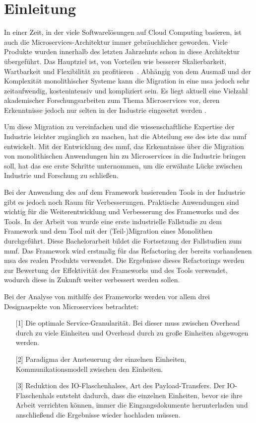 \chapter{Einleitung}
\label{chap:einleitung}

In einer Zeit, in der viele Softwarelösungen auf Cloud Computing basieren, ist auch die Mi\-cro\-services-Architektur immer gebräuchlicher geworden.
Viele Produkte wurden innerhalb des letzten Jahrzehnts schon in diese Architektur übergeführt.
Das Hauptziel ist, von Vorteilen wie besserer Skalierbarkeit, Wartbarkeit und Flexibilität zu profitieren~\cite{Fritzsch_2019,taibi2017processmotivations}.
Abhängig von dem Ausmaß und der Komplexität monolithischer Systeme kann die Migration in eine \gls{msa} jedoch sehr zeitaufwendig, kostenintensiv und kompliziert sein.
Es liegt aktuell eine Vielzahl akademischer Forschungsarbeiten zum Thema Microservices vor, deren Erkenntnisse jedoch nur selten in der Industrie eingesetzt werden \cite{fritzsch2022architecturecentric}.

Um diese Migration zu vereinfachen und die wissenschaftliche Expertise der Industrie leichter zugänglich zu machen, hat die Abteilung \gls{ese} des \gls{iste} das \gls{mmf} entwickelt.
Mit der Entwicklung des \gls{mmf}, das Erkenntnisse über die Migration von monolithischen Anwendungen hin zu Microservices in die Industrie bringen soll, hat das \gls{ese} erste Schritte unternommen, um die erwähnte Lücke zwischen Industrie und Forschung zu schließen.

Bei der Anwendung des auf dem Framework basierenden Tools in der Industrie gibt es jedoch noch Raum für Verbesserungen.
Praktische Anwendungen sind wichtig für die Weiterentwicklung und Verbesserung des Frameworks und des Tools.
In der Arbeit von  wurde eine erste industrielle Fallstudie zu dem Framework und dem Tool mit der (Teil-)Migration eines Monolithen durchgeführt.
Diese Bachelorarbeit bildet die Fortsetzung der Fallstudien zum \gls{mmf}.
Das Framework wird erstmalig für das Refactoring der bereits vorhandenen \gls{msa} des realen Produkts \jf verwendet.
Die Ergebnisse dieses Refactorings werden zur Bewertung der Effektivität des Frameworks und des Tools verwendet, wodurch diese in Zukunft weiter verbessert werden sollen.

Bei der Analyse von \jf mithilfe des Frameworks werden vor allem drei Designaspekte von Microservices betrachtet:
\begin{enumerate}
	\item[{[1]}] Die optimale Service-Granularität. Bei dieser muss zwischen Overhead durch zu viele Einheiten und Overhead durch zu große Einheiten abgewogen werden.
	\item[{[2]}] Paradigma der Ansteuerung der einzelnen Einheiten, Kommunikationsmodell zwischen den Einheiten.
	\item[{[3]}] Reduktion des IO-Flaschenhalses, Art des Payload-Transfers. %
	Der IO-Flaschenhals entsteht dadurch, dass die einzelnen Einheiten, bevor sie ihre Arbeit verrichten können, immer die Eingangsdokumente herunterladen und anschließend die Ergebnisse wieder hochladen müssen.
\end{enumerate}

